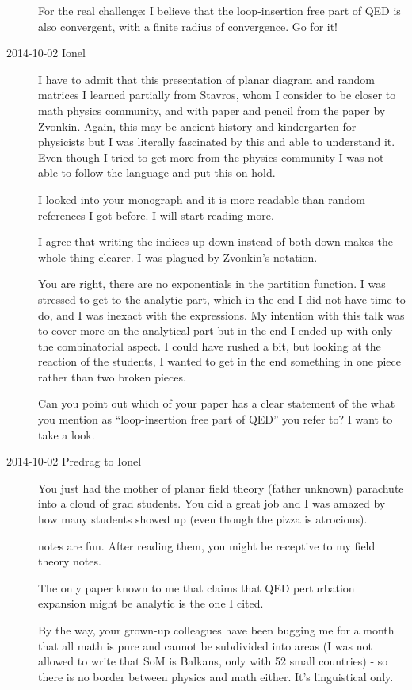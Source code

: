 \begin{description}
For the real challenge: I believe that the loop-insertion free part of
QED is also convergent, with a finite radius of convergence. Go for it!

\item[2014-10-02 Ionel]
I have to admit that this presentation of planar diagram and random
matrices I learned partially from Stavros, whom I consider to be closer
to math physics community, and with paper and pencil from the paper by
Zvonkin.  Again, this may be ancient history and
kindergarten for physicists but I was literally fascinated by this and
able to understand it.  Even though I tried to get more from the physics
community I was not able to follow the language and put this on hold.

I looked into your monograph and it is more readable than random
references I got before. I will start reading more.

I agree that writing the indices up-down instead of both down makes the
whole thing clearer.  I was plagued by Zvonkin's notation.

You are right, there are no exponentials in the partition function. I was
stressed to get to the analytic part, which in the end I did not have
time to do, and I was inexact with the expressions.
My intention with this talk was to cover more on the analytical part but
in the end I ended up with only the combinatorial aspect.  I could have
rushed a bit, but looking at the reaction of the students, I wanted to
get in the end something in one piece rather than two broken pieces.

Can you point out which of your paper has a clear statement of the what
you mention as ``loop-insertion free part of QED'' you refer to?  I want to
take a look.

\item[2014-10-02 Predrag to Ionel]
 You just had the mother of planar field theory (father unknown)
 parachute into a cloud of grad students. You did a great job and I was
 amazed by how many students showed up (even though the pizza is
 atrocious).

 notes are fun. After reading them, you might be receptive to my
 {field theory notes}.

The only paper known to me that claims that QED perturbation expansion
might be analytic is the one I cited.

By the way, your grown-up colleagues have been bugging me for a month
that all math is pure and cannot be subdivided into areas (I was not
allowed to write that SoM is Balkans, only with 52 small countries) - so
there is no border between physics and math either. It's linguistical
only.


\end{description}
